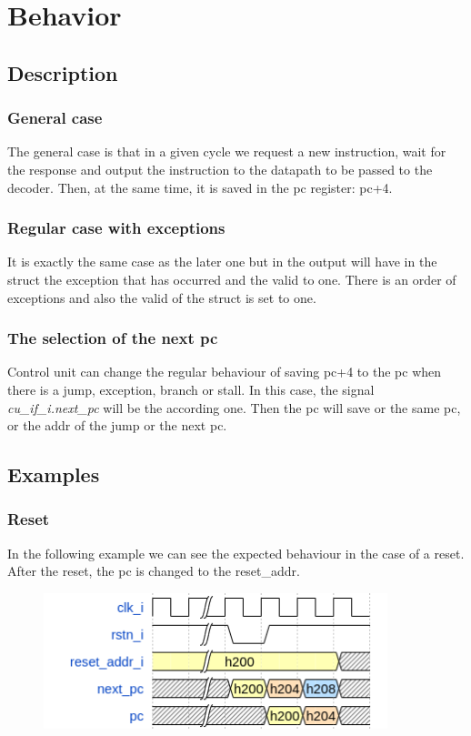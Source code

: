 \section{Behavior}

\subsection{Description}

\subsubsection{General case}
The general case is that in a given cycle we request a new instruction, wait for the response and output the instruction to the datapath to be passed to the decoder. Then, at the same time, it is saved in the pc register: pc+4.

\subsubsection{Regular case with exceptions}
It is exactly the same case as the later one but in the output will have in the struct the exception that has occurred and the valid to one. There is an order of exceptions and also the valid of the struct is set to one.

\subsubsection{The selection of the next pc}
Control unit can change the regular behaviour of saving pc+4 to the pc when there is a jump, exception, branch or stall. In this case, the signal \textit{cu\_if\_i.next\_pc} will be the according one. Then the pc will save or the same pc, or the addr of the jump or the next pc.

\newpage
\subsection{Examples}

\subsubsection{Reset}
In the following example we can see the expected behaviour in the case of a reset. After the reset, the pc is changed to the reset\_addr.

\begin{figure}[H]
\centering
\includegraphics[width=10cm]{Figure/reset.png}
\end{figure}


